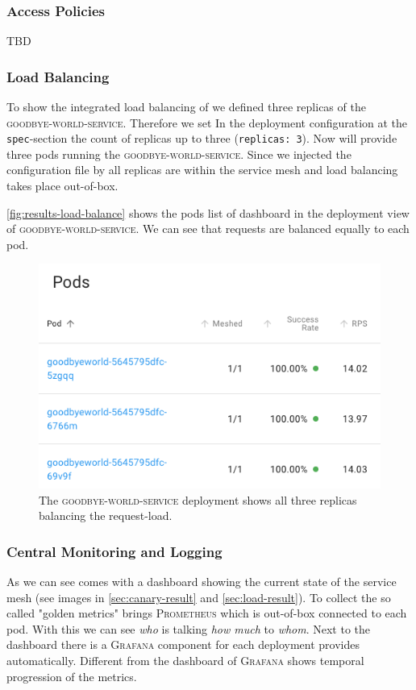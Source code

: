 \subsubsection{Access Policies}
TBD

\subsubsection{Load Balancing}
\label{sec:load-result}
To show the integrated load balancing of \linkerd{} we defined three replicas of the \textsc{goodbye-world-service}.
Therefore we set In the deployment configuration at the \lstinline|spec|-section the count of replicas up to three	 (\lstinline|replicas: 3|).
Now \kubernetes{} will provide three pods running the \textsc{goodbye-world-service}.
Since we injected the configuration file by \linkerd{} all replicas are within the service mesh and load balancing takes place out-of-box.

\autoref{fig:results-load-balance} shows the pods list of \linkerd{} dashboard in the deployment view of \textsc{goodbye-world-service}.
We can see that requests are balanced equally to each pod.

\begin{figure}
	\includegraphics[width=\columnwidth]{img/results-load-balance}
	\caption{The \textsc{goodbye-world-service} deployment shows all three replicas balancing the request-load.}
	\label{fig:results-load-balance}
\end{figure}

\subsubsection{Central Monitoring and Logging}
\label{sec:log-result}
As we can see \linkerd{} comes with a dashboard showing the current state of the service mesh (see images in \autoref{sec:canary-result} and \autoref{sec:load-result}).
To collect the so called "golden metrics" \linkerd{} brings \textsc{Prometheus} which is out-of-box connected to each pod.
With this we can see \textit{who} is talking \textit{how much} to \textit{whom}.
Next to the \linkerd{} dashboard there is a \textsc{Grafana} component for each deployment \linkerd{} provides automatically.
Different from the dashboard of \linkerd{} \textsc{Grafana} shows temporal progression of the metrics.

